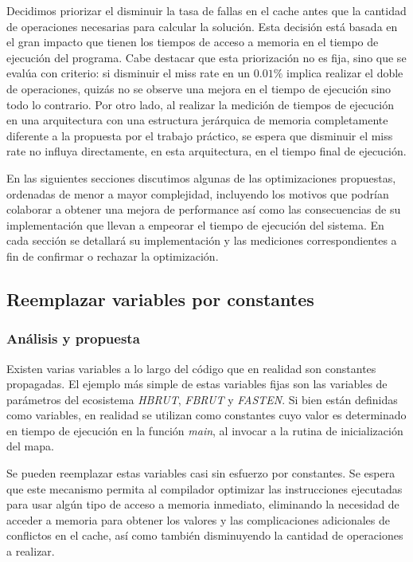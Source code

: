 \documentclass[a4paper,11pt]{article}
\begin{document}
Decidimos priorizar el disminuir la tasa de fallas en el cache antes que la
cantidad de operaciones necesarias para calcular la solución. Esta decisión
está basada en el gran impacto que tienen los tiempos de acceso a memoria en el
tiempo de ejecución del programa. Cabe destacar que esta priorización no es
fija, sino que se evalúa con criterio: si disminuir el miss rate en un
\(0.01\%\) implica realizar el doble de operaciones, quizás no se observe una
mejora en el tiempo de ejecución sino todo lo contrario. Por otro lado, al
realizar la medición de tiempos de ejecución en una arquitectura con una
estructura jerárquica de memoria completamente diferente a la propuesta por el
trabajo práctico, se espera que disminuir el miss rate no influya directamente,
en esta arquitectura, en el tiempo final de ejecución.

En las siguientes secciones discutimos algunas de las optimizaciones
propuestas, ordenadas de menor a mayor complejidad, incluyendo los motivos que
podrían colaborar a obtener una mejora de performance así como las
consecuencias de su implementación que llevan a empeorar el tiempo de ejecución
del sistema. En cada sección se detallará su implementación y las mediciones
correspondientes a fin de confirmar o rechazar la optimización.

\subsection{Reemplazar variables por constantes}

\subsubsection{Análisis y propuesta}

Existen varias variables a lo largo del código que en realidad son constantes
propagadas. El ejemplo más simple de estas variables fijas son las variables de
parámetros del ecosistema \textit{HBRUT}, \textit{FBRUT} y \textit{FASTEN}. Si
bien están definidas como variables, en realidad se utilizan como constantes
cuyo valor es determinado en tiempo de ejecución en la función \textit{main},
al invocar a la rutina de inicialización del mapa.

Se pueden reemplazar estas variables casi sin esfuerzo por constantes. Se
espera que este mecanismo permita al compilador optimizar las instrucciones
ejecutadas para usar algún tipo de acceso a memoria inmediato, eliminando la
necesidad de acceder a memoria para obtener los valores y las complicaciones
adicionales de conflictos en el cache, así como también disminuyendo la
cantidad de operaciones a realizar.
\end{document}
